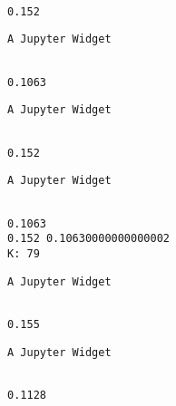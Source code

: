 \documentclass[11pt]{article}
\begin{document}
    
    \begin{Verbatim}[commandchars=\\\{\}]

0.152

    \end{Verbatim}

    
    \begin{verbatim}
A Jupyter Widget
    \end{verbatim}

    
    \begin{Verbatim}[commandchars=\\\{\}]

0.1063

    \end{Verbatim}

    
    \begin{verbatim}
A Jupyter Widget
    \end{verbatim}

    
    \begin{Verbatim}[commandchars=\\\{\}]

0.152

    \end{Verbatim}

    
    \begin{verbatim}
A Jupyter Widget
    \end{verbatim}

    
    \begin{Verbatim}[commandchars=\\\{\}]

0.1063
0.152 0.10630000000000002
K: 79

    \end{Verbatim}

    
    \begin{verbatim}
A Jupyter Widget
    \end{verbatim}

    
    \begin{Verbatim}[commandchars=\\\{\}]

0.155

    \end{Verbatim}

    
    \begin{verbatim}
A Jupyter Widget
    \end{verbatim}

    
    \begin{Verbatim}[commandchars=\\\{\}]

0.1128

    \end{Verbatim}
\end{document}
